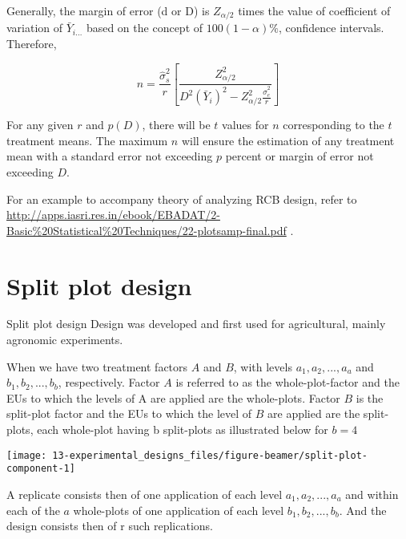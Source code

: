\documentclass[
  ignorenonframetext,
  aspectratio=169]{beamer}
\begin{document}
\begin{frame}{}
\protect\hypertarget{section-10}{}
Generally, the margin of error (d or D) is \(Z_{\alpha/2}\) times the
value of coefficient of variation of \(\bar{Y}_{i...}\) based on the
concept of \(100(1-\alpha)\%\), confidence intervals. Therefore,

\[
n = \frac{\hat{\sigma}_s^2}{r} \left[\frac{Z_{\alpha/2}^2}{D^2 (\bar{Y}_i)^2 - Z_{\alpha/2}^2 \frac{\hat{\sigma}_e^2}{r}} \right]
\]

For any given \(r\) and \(p(D)\), there will be \(t\) values for \(n\)
corresponding to the \(t\) treatment means. The maximum \(n\) will
ensure the estimation of any treatment mean with a standard error not
exceeding \(p\) percent or margin of error not exceeding \(D\).

For an example to accompany theory of analyzing RCB design, refer to
\url{http://apps.iasri.res.in/ebook/EBADAT/2-Basic\%20Statistical\%20Techniques/22-plotsamp-final.pdf}
.
\end{frame}

\hypertarget{split-plot-design}{%
\section{Split plot design}\label{split-plot-design}}

\begin{frame}{Split plot design}
\protect\hypertarget{split-plot-design-1}{}
Design was developed and first used for agricultural, mainly agronomic
experiments.

When we have two treatment factors \(A\) and \(B\), with levels
\(a_1, a_2, ..., a_a\) and \(b_1, b_2, ..., b_b\), respectively. Factor
\(A\) is referred to as the whole-plot-factor and the EUs to which the
levels of A are applied are the whole-plots. Factor \(B\) is the
split-plot factor and the EUs to which the level of \(B\) are applied
are the split-plots, each whole-plot having b split-plots as illustrated
below for \(b = 4\)

\begin{center}\texttt{[image: 13-experimental\_designs\_files/figure-beamer/split-plot-component-1]} \end{center}

A replicate consists then of one application of each level
\(a_1, a_2, ..., a_a\) and within each of the \(a\) whole-plots of one
application of each level \(b_1, b_2, ..., b_b\). And the design
consists then of r such replications.
\end{frame}
\end{document}

